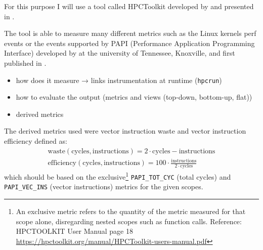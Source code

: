 \documentclass[a4paper, 11pt]{memoir}
\begin{document}
    For this purpose I will use a tool called HPCToolkit developed by \citeauthor{hpc_toolkit} and presented in
     \cite{hpc_toolkit}.

    The tool is able to measure many different metrics such as the Linux kernels perf events or the events supported by
    PAPI (Performance Application Programming Interface) developed by \citeauthor{papi} at the university of Tennessee,
    Knoxville, and first published in  \cite{papi}.

    \begin{itemize}
        \item how does it measure →  links instrumentation at runtime (\texttt{hpcrun})
        \item how to evaluate the output (metrics and views (top-down, bottom-up, flat))
        \item derived metrics
    \end{itemize}

    The derived metrics used were vector instruction waste and vector instruction efficiency defined as:
    \begin{align}
        \text{waste}(\text{cycles}, \text{instructions}) = 2 \cdot \text{cycles} - \text{instructions} \label{eq:vec_waste}\\
        \text{efficiency}(\text{cycles}, \text{instructions}) = 100 \cdot \frac{\text{instructions}}{2\cdot\text{cycles}}
        \label{eq:vec_efficiency}
    \end{align}
    which should be based on the exclusive\footnote{An exclusive metric refers to the quantity of the metric measured
    for that scope alone, disregarding nested scopes such as function calls. Reference: HPCTOOLKIT User Manual page 18
    \href{https://hpctoolkit.org/manual/HPCToolkit-users-manual.pdf}{https://hpctoolkit.org/manual/HPCToolkit-users-manual.pdf}}
    \texttt{PAPI_TOT_CYC} (total cycles) and \texttt{PAPI_VEC_INS}
    (vector instructions) metrics for the given scopes.

\end{document}
